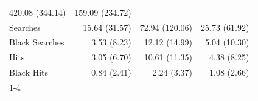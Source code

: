 \begin{table}[!h]
\begin{tabular}{llll}
  \multicolumn{1}{r}{420.08 (344.14)} &
  \multicolumn{1}{r}{159.09 (234.72)} \\
\multicolumn{1}{l}{\hspace{1em}Searches} &
  \multicolumn{1}{r}{15.64 (31.57)} &
  \multicolumn{1}{r}{72.94 (120.06)} &
  \multicolumn{1}{r}{25.73 (61.92)} \\
\multicolumn{1}{l}{\hspace{1em}Black Searches} &
  \multicolumn{1}{r}{3.53 (8.23)} &
  \multicolumn{1}{r}{12.12 (14.99)} &
  \multicolumn{1}{r}{5.04 (10.30)} \\
\multicolumn{1}{l}{\hspace{1em}Hits} &
  \multicolumn{1}{r}{3.05 (6.70)} &
  \multicolumn{1}{r}{10.61 (11.35)} &
  \multicolumn{1}{r}{4.38 (8.25)} \\
\multicolumn{1}{l}{\hspace{1em}Black Hits} &
  \multicolumn{1}{r}{0.84 (2.41)} &
  \multicolumn{1}{r}{2.24 (3.37)} &
  \multicolumn{1}{r}{1.08 (2.66)} \\
\cline{1-4}
\end{tabular}
\end{table}
